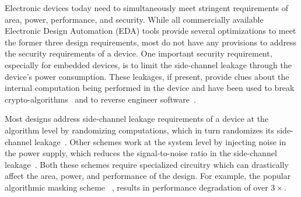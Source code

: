 






Electronic devices today need to simultaneously meet  stringent requirements of area, power, performance, and security. While all commercially available Electronic Design Automation (EDA) tools provide several optimizations to meet the former three design requirements, most do not have any provisions to address the security requirements of a device. One important security requirement, especially for embedded devices, is to limit the side-channel leakage through the device's power consumption. These leakages, if present, provide clues about the internal computation being performed in the device and  have been used to break crypto-algorithms~\cite{kocher:99} and to reverse engineer software~\cite{park:2018}.

 Most designs address side-channel leakage requirements of a device at the algorithm level by randomizing computations, which  in turn randomizes its side-channel leakage~\cite{akkar:2001}. Other schemes work at the system level by injecting noise in the power supply, which reduces the signal-to-noise ratio in the side-channel leakage~\cite{Wang:2013,tokunaga:2009,singh:2015,mathew:2018}. Both these schemes require specialized circuitry which can drastically affect the area, power, and performance of the design. For example, the  popular algorithmic masking scheme ~\cite{canright}, results in performance degradation of over $3\times$. 

